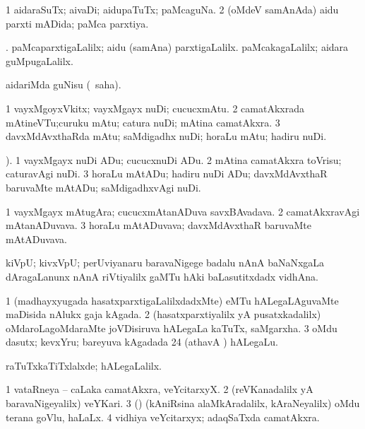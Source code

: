 \bentry
{}
\gl{\gu}
\bmng
\bnum
\num{1} aidaraSuTx; aivaDi; aidupaTuTx; paMcaguNa. 
\num{2} (oMdeV samAnAda) aidu parxti mADida; paMca parxtiya. 
\enum
\emng

\noindent
\gl{\pagu}
\expl{}
\bmng
{}. 
\banum
{} paMcaparxtigaLalilx; aidu (samAna) parxtigaLalilx. 
 paMcakagaLalilx; aidara guMpugaLalilx. 
\eanum
\emng
\eentry

\bentry
{}
\gl{\sakirx}
\expl{}
\bmng
aidariMda guNisu (\akirx\ saha). 
\emng
\eentry

\bentry
{}
\gl{\nA }
\bmng
\bnum
\num{1} vayxMgoyxVkitx; vayxMgayx nuDi; cucucxmAtu. 
\num{2} camatAkxrada mAtineVTu;curuku mAtu; catura nuDi; mAtina camatAkxra. 
\num{3} davxMdAvxthaRda mAtu; saMdigadhx nuDi; horaLu mAtu; hadiru nuDi. 
\enum
\emng
\eentry

\bentry
{}
\gl{\akirx}
).\bmng
\bnum
\num{1} vayxMgayx nuDi ADu; cucucxnuDi ADu. 
\num{2} mAtina camatAkxra toVrisu; caturavAgi nuDi. 
\num{3} horaLu mAtADu; hadiru nuDi ADu; davxMdAvxthaR baruvaMte mAtADu; saMdigadhxvAgi nuDi. 
\enum
\emng
\eentry

\bentry
{}
\gl{\nA}
\bmng
\bnum
\num{1} vayxMgayx mAtugAra; cucucxmAtanADuva savxBAvadava. 
\num{2} camatAkxravAgi mAtanADuvava. 
\num{3} horaLu mAtADuvava; davxMdAvxthaR baruvaMte mAtADuvava. 
\enum
\emng
\eentry

\bentry
{}
\gl{\nA}
\bmng
kiVpU; kivxVpU; perUviyanaru baravaNigege badalu nAnA baNaNxgaLa dAragaLanunx nAnA riVtiyalilx gaMTu hAki baLasutitxdadx vidhAna. 
\emng
\eentry

\bentry
{}
\gl{\nA}
\bmng
\bnum
\num{1} (madhayxyugada hasatxparxtigaLalilxdadxMte) eMTu hALegaLAguvaMte maDisida nAlukx gaja kAgada. 
\num{2} (hasatxparxtiyalilx yA pusatxkadalilx) oMdaroLagoMdaraMte joVDisiruva hALegaLa kaTuTx, saMgarxha. 
\num{3} oMdu dasutx; kevxYru; bareyuva kAgadada {\rm 24} (athavA ) hALegaLu. 
\enum
\emng

\noindent
\gl{\pagu}
\bmng
{} raTuTxkaTiTxlalxde; hALegaLalilx. 
\emng
\eentry

\bentry
{}
\gl{\nA}
\bmng
\bnum
\num{1} vataRneya -- caLaka camatAkxra, veYcitarxyX. 
\num{2} (reVKanadalilx yA baravaNigeyalilx) veYKari. 
\num{3} (\vAshi) (kAniRsina alaMkAradalilx, kAraNeyalilx) oMdu terana goVlu, haLaLx. 
\num{4} vidhiya veYcitarxyx; adaqSaTxda camatAkxra. 
\enum
\emng
\eentry


